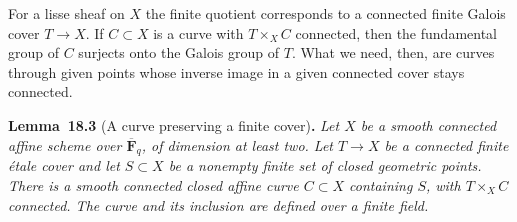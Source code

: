 \documentclass[11pt]{article}
\newenvironment{bpstatement}[2]{\par\addvspace{0.6\baselineskip}\noindent\textbf{#1}#2\textbf{.}\enspace\ignorespaces}
  {\par\addvspace{0.4\baselineskip}}
\newenvironment{bpstatementit}[2]{\begin{bpstatement}{#1}{#2}\itshape\ignorespaces}{\end{bpstatement}}
\begin{document}
\label{bp10}%
For a lisse sheaf on \(X\) the finite quotient corresponds to a connected finite Galois cover \(T\to X\). If \(C\subset X\) is a curve with \(T\times_XC\) connected, then the fundamental group of \(C\) surjects onto the Galois group of \(T\). What we need, then, are curves through given points whose inverse image in a given connected cover stays connected.

\label{bp11}%
\begin{bpstatementit}{Lemma~18.3}{ (A curve preserving a finite cover)}
Let \(X\) be a smooth connected affine scheme over \(\overline{\mathbf F}_q\), of dimension at least two. Let \(T\to X\) be a connected finite étale cover and let \(S\subset X\) be a nonempty finite set of closed geometric points. There is a smooth connected closed affine curve \(C\subset X\) containing \(S\), with \(T\times_XC\) connected. The curve and its inclusion are defined over a finite field.
\end{bpstatementit}
\end{document}
